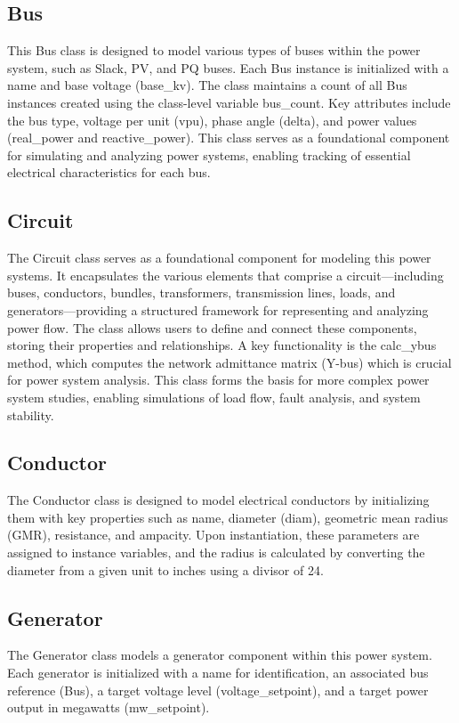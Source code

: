 \documentclass{article}
\begin{document}
	\subsection{Bus}
	This Bus class is designed to model various types of buses within the power system, such as Slack, PV, and PQ buses. Each Bus instance is initialized with a name and base voltage (base\_kv). The class maintains a count of all Bus instances created using the class-level variable bus\_count. Key attributes include the bus type, voltage per unit (vpu), phase angle (delta), and power values (real\_power and reactive\_power). This class serves as a foundational component for simulating and analyzing power systems, enabling tracking of essential electrical characteristics for each bus.
	
	\subsection{Circuit}
	The Circuit class serves as a foundational component for modeling this power systems. It encapsulates the various elements that comprise a circuit—including buses, conductors, bundles, transformers, transmission lines, loads, and generators—providing a structured framework for representing and analyzing power flow. The class allows users to define and connect these components, storing their properties and relationships.  A key functionality is the calc\_ybus method, which computes the network admittance matrix (Y-bus) which is crucial for power system analysis. This class forms the basis for more complex power system studies, enabling simulations of load flow, fault analysis, and system stability.
	
	\subsection{Conductor}
	The Conductor class is designed to model electrical conductors by initializing them with key properties such as name, diameter (diam), geometric mean radius (GMR), resistance, and ampacity. Upon instantiation, these parameters are assigned to instance variables, and the radius is calculated by converting the diameter from a given unit to inches using a divisor of 24.
	
	\subsection{Generator}
	The Generator class models a generator component within this  power system. Each generator is initialized with a name for identification, an associated bus reference (Bus), a target voltage level (voltage\_setpoint), and a target power output in megawatts (mw\_setpoint).
	
\end{document}
